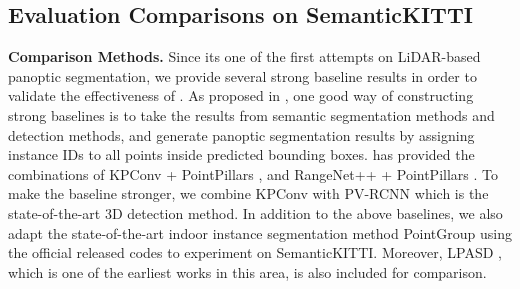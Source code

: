 \documentclass[final]{cvpr}
\begin{document}
\subsection{Evaluation Comparisons on SemanticKITTI}

\noindent\textbf{Comparison Methods.}
Since its one of the first attempts on LiDAR-based panoptic segmentation,
we provide several strong baseline results in order to validate the effectiveness of \nickname{}.
As proposed in \cite{behley2020benchmark}, one good way of constructing strong baselines is to take the results from
semantic segmentation methods and detection methods, and generate panoptic segmentation results by assigning instance
IDs to all points inside predicted bounding boxes.
\cite{behley2020benchmark} has provided the combinations of KPConv \cite{thomas2019kpconv} +
PointPillars \cite{lang2019pointpillars}, and RangeNet++ \cite{milioto2019rangenet++} +
PointPillars \cite{lang2019pointpillars}.
To make the baseline stronger, we combine KPConv \cite{thomas2019kpconv} with
PV-RCNN \cite{shi2020pv} which is the state-of-the-art 3D detection method.
In addition to the above baselines, we also adapt the state-of-the-art indoor
instance segmentation method PointGroup \cite{jiang2020pointgroup} using the official released codes to experiment on SemanticKITTI.
Moreover, LPASD \cite{milioto2020iros}, which is one of the earliest works in this area, is also included for comparison.
\end{document}
